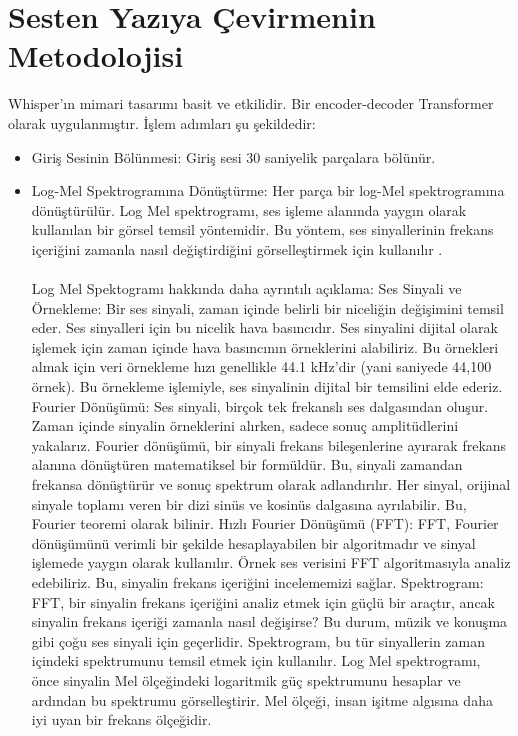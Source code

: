 \documentclass{article}
\begin{document}
	\section{Sesten Yazıya Çevirmenin Metodolojisi}
	Whisper’ın mimari tasarımı basit ve etkilidir. Bir encoder-decoder Transformer olarak uygulanmıştır. İşlem adımları şu şekildedir:
	\begin{itemize}
		\item Giriş Sesinin Bölünmesi: Giriş sesi 30 saniyelik parçalara bölünür.
		\item Log-Mel Spektrogramına Dönüştürme: Her parça bir log-Mel spektrogramına dönüştürülür.
		Log Mel spektrogramı, ses işleme alanında yaygın olarak kullanılan bir görsel temsil yöntemidir. Bu yöntem, ses sinyallerinin frekans içeriğini zamanla nasıl değiştirdiğini görselleştirmek için kullanılır \cite{logmel}. \\ \\ Log Mel Spektogramı hakkında daha ayrıntılı açıklama:
		\subitem Ses Sinyali ve Örnekleme: Bir ses sinyali, zaman içinde belirli bir niceliğin değişimini temsil eder. Ses sinyalleri için bu nicelik hava basıncıdır. Ses sinyalini dijital olarak işlemek için zaman içinde hava basıncının örneklerini alabiliriz. Bu örnekleri almak için veri örnekleme hızı genellikle 44.1 kHz’dir (yani saniyede 44,100 örnek). Bu örnekleme işlemiyle, ses sinyalinin dijital bir temsilini elde ederiz.
		\subitem Fourier Dönüşümü: Ses sinyali, birçok tek frekanslı ses dalgasından oluşur. Zaman içinde sinyalin örneklerini alırken, sadece sonuç amplitüdlerini yakalarız. Fourier dönüşümü, bir sinyali frekans bileşenlerine ayırarak frekans alanına dönüştüren matematiksel bir formüldür. Bu, sinyali zamandan frekansa dönüştürür ve sonuç spektrum olarak adlandırılır. Her sinyal, orijinal sinyale toplamı veren bir dizi sinüs ve kosinüs dalgasına ayrılabilir. Bu, Fourier teoremi olarak bilinir.
		\subitem Hızlı Fourier Dönüşümü (FFT): FFT, Fourier dönüşümünü verimli bir şekilde hesaplayabilen bir algoritmadır ve sinyal işlemede yaygın olarak kullanılır. Örnek ses verisini FFT algoritmasıyla analiz edebiliriz. Bu, sinyalin frekans içeriğini incelememizi sağlar.
		\subitem Spektrogram: FFT, bir sinyalin frekans içeriğini analiz etmek için güçlü bir araçtır, ancak sinyalin frekans içeriği zamanla nasıl değişirse? Bu durum, müzik ve konuşma gibi çoğu ses sinyali için geçerlidir. Spektrogram, bu tür sinyallerin zaman içindeki spektrumunu temsil etmek için kullanılır. Log Mel spektrogramı, önce sinyalin Mel ölçeğindeki logaritmik güç spektrumunu hesaplar ve ardından bu spektrumu görselleştirir. Mel ölçeği, insan işitme algısına daha iyi uyan bir frekans ölçeğidir.

\end{itemize}
\end{document}
